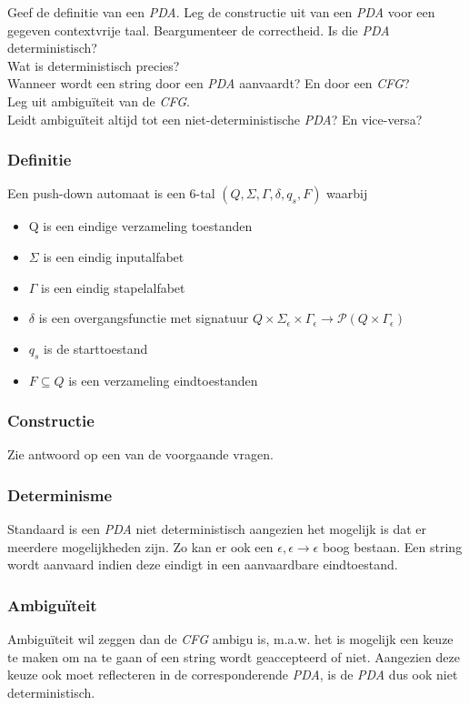 \begin{quest}
  Geef de definitie van een \emph{PDA}. Leg de constructie uit van een \emph{PDA} voor een gegeven contextvrije taal. Beargumenteer de correctheid.
  Is die \emph{PDA} deterministisch?\\
  Wat is deterministisch precies?\\
  Wanneer wordt een string door een \emph{PDA} aanvaardt? En door een \emph{CFG}?\\
  Leg uit ambigu\"iteit van de \emph{CFG}.\\
  Leidt ambigu\"iteit altijd tot een niet-deterministische \emph{PDA}? En vice-versa?
\end{quest}

\subsubsection*{Definitie}

\begin{theorem}
  Een push-down automaat is een 6-tal $(Q,\Sigma, \Gamma, \delta, q_s, F)$ waarbij
  \begin{itemize}
    \item Q is een eindige verzameling toestanden
    \item $\Sigma$ is een eindig inputalfabet
    \item $\Gamma$ is een eindig stapelalfabet
    \item $\delta$ is een overgangsfunctie met signatuur $Q \times \Sigma_\epsilon \times \Gamma_\epsilon \rightarrow \mathcal{P}(Q \times \Gamma_\epsilon)$
    \item $q_s$ is de starttoestand
    \item $F \subseteq Q$ is een verzameling eindtoestanden
  \end{itemize}
\end{theorem}

\subsubsection*{Constructie}

Zie antwoord op een van de voorgaande vragen.

\subsubsection*{Determinisme}

Standaard is een \emph{PDA} niet deterministisch aangezien het mogelijk is dat er meerdere mogelijkheden zijn. Zo kan er ook een $\epsilon, \epsilon \rightarrow \epsilon$ boog bestaan. Een string wordt aanvaard indien deze eindigt in een aanvaardbare eindtoestand.

\subsubsection*{Ambigu\"iteit}

Ambigu\"iteit wil zeggen dan de \emph{CFG} ambigu is, m.a.w. het is mogelijk een keuze te maken om na te gaan of een string wordt geaccepteerd of niet. Aangezien deze keuze ook moet reflecteren in de corresponderende \emph{PDA}, is de \emph{PDA} dus ook niet deterministisch.

